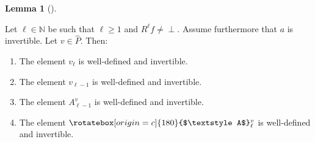 \documentclass[numbers=enddot,12pt,final,onecolumn,notitlepage]{scrartcl}%
\theoremstyle{definition}
\newtheorem{lem}[theo]{Lemma}
\newenvironment{lemma}[1][]
{\begin{lem}[#1]\begin{leftbar}}
{\end{leftbar}\end{lem}}
\newcommand{\undf}{\operatorname*{\bot}}
\newcommand{\upslack}{\mathchoice{\rotatebox[origin=c]{180}{$\displaystyle A$}}{\rotatebox[origin=c]{180}{$\textstyle A$}}{\rotatebox[origin=c]{180}{$\scriptstyle A$}}{\rotatebox[origin=c]{180}{$\scriptscriptstyle A$}}}
\newcommand{\downslack}{A}
\begin{document}
\begin{lemma}
\label{lem.slacks.wd}Let $\ell\in\mathbb{N}$ be such that $\ell\geq1$ and
$R^{\ell}f\neq\undf$. Assume furthermore that $a$ is invertible. Let
$v\in\widehat{P}$. Then:

\begin{enumerate}
\item[\textbf{(a)}] The element $v_{\ell}$ is well-defined and invertible.

\item[\textbf{(b)}] The element $v_{\ell-1}$ is well-defined and invertible.

\item[\textbf{(c)}] The element $\downslack_{\ell-1}^{v}$ is well-defined and invertible.

\item[\textbf{(d)}] The element $\upslack_{\ell}^{v}$ is well-defined and invertible.
\end{enumerate}
\end{lemma}

\end{document}
